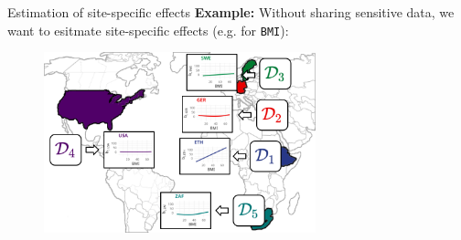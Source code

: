 \documentclass[t,10pt]{beamer}
\begin{document}
\begin{frame}{Estimation of site-specific effects}
  \textbf{Example:} Without sharing sensitive data, we want to esitmate site-specific effects (e.g. for \texttt{BMI}):
  \begin{figure}
    \centering
    \includegraphics[width=0.7\textwidth]{figures/fig-site-effects.png}
  \end{figure}
\end{frame}
\end{document}
